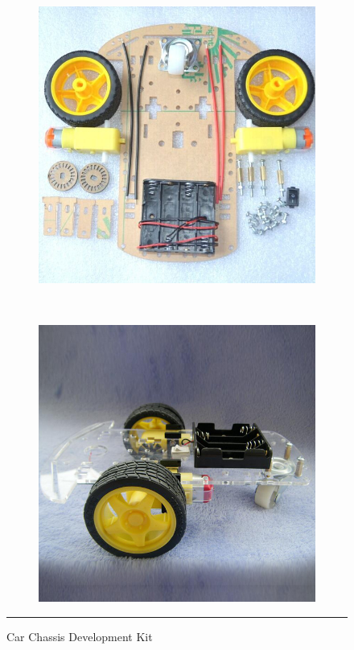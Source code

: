 \begin{figure}[h!]
        \centering
        \begin{subfigure}[b]{0.5\textwidth}
                \includegraphics[width=\textwidth]{./Pictures/Car-Chassis-Kit.jpg}
        \end{subfigure}%
        ~ %
        \begin{subfigure}[b]{0.5\textwidth}
                \includegraphics[width=\textwidth]{./Pictures/Car-Chassis-Kit2.jpg}
        \end{subfigure}
        \rule{1\textwidth}{1pt}
        \caption{Car Chassis Development Kit}
\end{figure}
